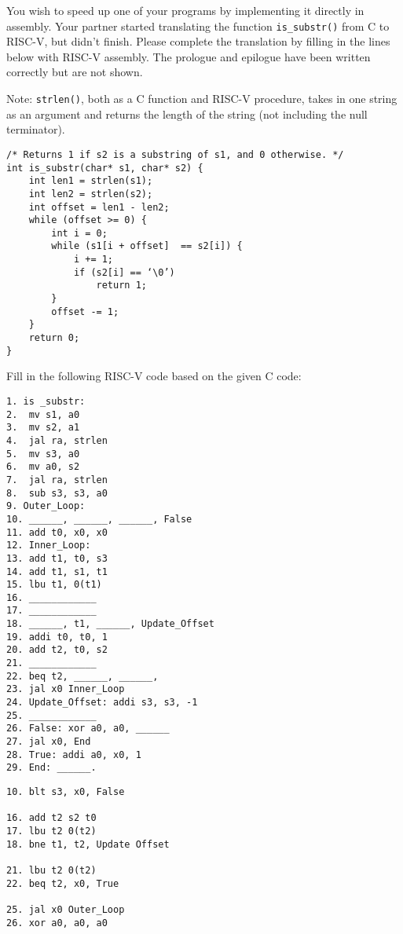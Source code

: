 \begin{blocksection}
\question
You wish to speed up one of your programs by implementing it directly in assembly. Your partner started translating the function \lstinline$is_substr()$ from C to RISC-V, but didn’t finish. Please complete the translation by filling in the lines below with RISC-V assembly. The prologue and epilogue have been written correctly but are not shown.

Note: \lstinline$strlen()$, both as a C function and RISC-V procedure, takes in one string as an argument and returns the length of the string (not including the null terminator).

\begin{verbatim}
/* Returns 1 if s2 is a substring of s1, and 0 otherwise. */
int is_substr(char* s1, char* s2) {
    int len1 = strlen(s1);
    int len2 = strlen(s2);
    int offset = len1 - len2;
    while (offset >= 0) {
        int i = 0;
        while (s1[i + offset]  == s2[i]) {
            i += 1;
            if (s2[i] == ‘\0’) 
                return 1;
        }
        offset -= 1;
    }
    return 0;
}
\end{verbatim}

Fill in the following RISC-V code based on the given C code:

\begin{verbatim}
1. is _substr:
2. 	mv s1, a0
3. 	mv s2, a1
4. 	jal ra, strlen
5. 	mv s3, a0
6. 	mv a0, s2
7. 	jal ra, strlen
8. 	sub s3, s3, a0
9. Outer_Loop:
10. ______, ______, ______, False
11. add t0, x0, x0
12. Inner_Loop:
13. add t1, t0, s3
14. add t1, s1, t1
15. lbu t1, 0(t1)
16. ____________
17. ____________
18. ______, t1, ______, Update_Offset
19. addi t0, t0, 1
20. add t2, t0, s2
21. ____________
22. beq t2, ______, ______,
23. jal x0 Inner_Loop
24. Update_Offset: addi s3, s3, -1
25. ____________
26. False: xor a0, a0, ______
27. jal x0, End
28. True: addi a0, x0, 1
29. End: ______.
\end{verbatim}

\begin{solution}
\begin{verbatim}
10. blt s3, x0, False

16. add t2 s2 t0
17. lbu t2 0(t2)
18. bne t1, t2, Update Offset

21. lbu t2 0(t2)
22. beq t2, x0, True

25. jal x0 Outer_Loop
26. xor a0, a0, a0
\end{verbatim}
\end{solution}

\end{blocksection}